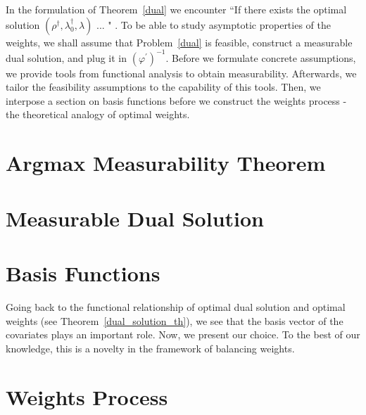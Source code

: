 In the formulation of Theorem~\ref{dual} we encounter “If there exists the optimal solution $(\rho^\dagger,\lambda_0^\dagger,\lambda)$ ... " .
To be able to study asymptotic properties of the weights, we 
shall assume that Problem~\ref{dual} is feasible,
construct a measurable dual solution, and plug it in $(\varphi^{'})^{-1}$.
Before we formulate concrete assumptions, we provide tools from functional analysis
to obtain measurability. Afterwards, we tailor the feasibility assumptions to the capability of this tools.
Then, we interpose a section on basis functions before we construct the weights process - the theoretical analogy of optimal weights.
\section{Argmax Measurability Theorem}
  
\section{Measurable Dual Solution}
  
\section{Basis Functions}
Going back to the functional relationship of optimal dual solution and optimal weights (see Theorem~\ref{dual_solution_th}), we see
that the basis vector of the covariates
plays an important role.
%
Now, we present our choice.
%
To the best of our knowledge, this is a novelty in the framework of balancing weights.

  
\section{Weights Process}
  
